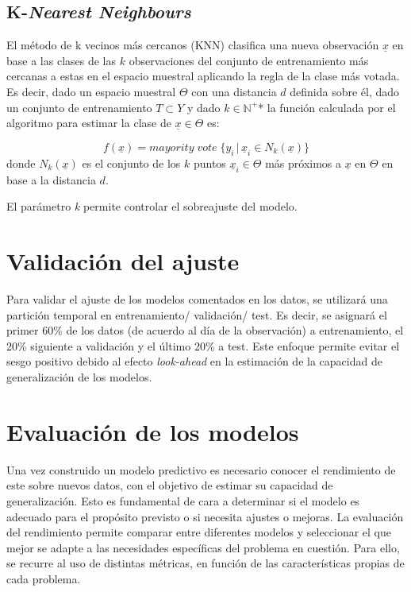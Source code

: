 \documentclass[12pt,a4paper,]{book}
\numberwithin{dummy}{section}
\theoremstyle{ocrenumbox}
\theoremstyle{blacknumex}
\theoremstyle{blacknumbox}
\theoremstyle{ocrenum}
\theoremstyle{ocrenum}
\begin{document}
\hypertarget{k-nearest-neighbours}{%
\subsection{\texorpdfstring{K-\emph{Nearest
Neighbours}}{K-Nearest Neighbours}}\label{k-nearest-neighbours}}

El método de k vecinos más cercanos (KNN) clasifica una nueva
observación \(\underline x\) en base a las clases de las \(k\)
observaciones del conjunto de entrenamiento más cercanas a estas en el
espacio muestral aplicando la regla de la clase más votada. Es decir,
dado un espacio muestral \(\Theta\) con una distancia \(d\) definida
sobre él, dado un conjunto de entrenamiento \(T \subset Y\) y dado
\(k \in \mathbb{N^+}\)* la función calculada por el algoritmo para
estimar la clase de \(\underline x \in \Theta\) es:

\[f(\underline x) = mayority\; vote\;\{ y_i \,| \, \underline x_i \in N_k(\underline x)\}\]
donde \(N_k(\underline x)\) es el conjunto de los \(k\) puntos
\(\underline x_i \in \Theta\) más próximos a \(\underline x\) en
\(\Theta\) en base a la distancia \(d\).

El parámetro \emph{k} permite controlar el sobreajuste del modelo.

\hypertarget{validaciuxf3n-del-ajuste}{%
\section{Validación del ajuste}\label{validaciuxf3n-del-ajuste}}

Para validar el ajuste de los modelos comentados en los datos, se
utilizará una partición temporal en entrenamiento/ validación/ test. Es
decir, se asignará el primer 60\% de los datos (de acuerdo al día de la
observación) a entrenamiento, el 20\% siguiente a validación y el último
20\% a test. Este enfoque permite evitar el sesgo positivo debido al
efecto \emph{look-ahead} en la estimación de la capacidad de
generalización de los modelos.

\hypertarget{evaluaciuxf3n-de-los-modelos}{%
\section{Evaluación de los modelos}\label{evaluaciuxf3n-de-los-modelos}}

Una vez construido un modelo predictivo es necesario conocer el
rendimiento de este sobre nuevos datos, con el objetivo de estimar su
capacidad de generalización. Esto es fundamental de cara a determinar si
el modelo es adecuado para el propósito previsto o si necesita ajustes o
mejoras. La evaluación del rendimiento permite comparar entre diferentes
modelos y seleccionar el que mejor se adapte a las necesidades
específicas del problema en cuestión. Para ello, se recurre al uso de
distintas métricas, en función de las características propias de cada
problema.
\end{document}

